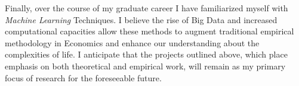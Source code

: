 \documentclass[a4paper,11pt]{article}
\begin{document}
	Finally, over the course of my graduate career I have familiarized myself with \textit{Machine Learning} Techniques. I believe the rise of Big Data and increased computational capacities allow these methods to augment traditional empirical methodology in Economics and enhance our understanding about the complexities of life. I anticipate that the projects outlined above, which place emphasis on both theoretical and empirical work, will remain as my primary focus of research for the foreseeable future. 
	
	
	
	
	
	
	
\end{document}
